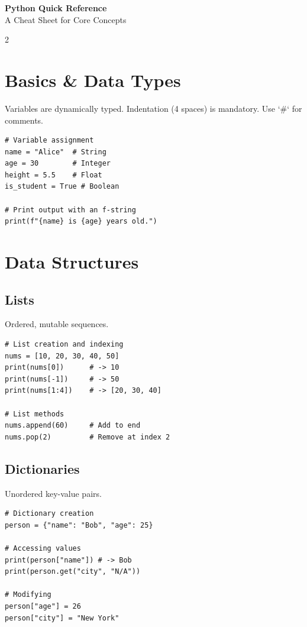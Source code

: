 \documentclass[10pt, a4paper]{article}
\begin{document}
\begin{center}
    {\Huge\bfseries Python Quick Reference} \\
    {\large A Cheat Sheet for Core Concepts}
\end{center}

\begin{multicols}{2} %

\section*{Basics & Data Types}
Variables are dynamically typed. Indentation (4 spaces) is mandatory. Use `#` for comments.
\begin{lstlisting}
# Variable assignment
name = "Alice"  # String
age = 30        # Integer
height = 5.5    # Float
is_student = True # Boolean

# Print output with an f-string
print(f"{name} is {age} years old.")
\end{lstlisting}

\section*{Data Structures}
\subsection*{Lists \faList}
Ordered, mutable sequences.
\begin{lstlisting}
# List creation and indexing
nums = [10, 20, 30, 40, 50]
print(nums[0])      # -> 10
print(nums[-1])     # -> 50
print(nums[1:4])    # -> [20, 30, 40]

# List methods
nums.append(60)     # Add to end
nums.pop(2)         # Remove at index 2
\end{lstlisting}

\subsection*{Dictionaries \faBook}
Unordered key-value pairs.
\begin{lstlisting}
# Dictionary creation
person = {"name": "Bob", "age": 25}

# Accessing values
print(person["name"]) # -> Bob
print(person.get("city", "N/A"))

# Modifying
person["age"] = 26
person["city"] = "New York"
\end{lstlisting}


\end{multicols}
\end{document}
